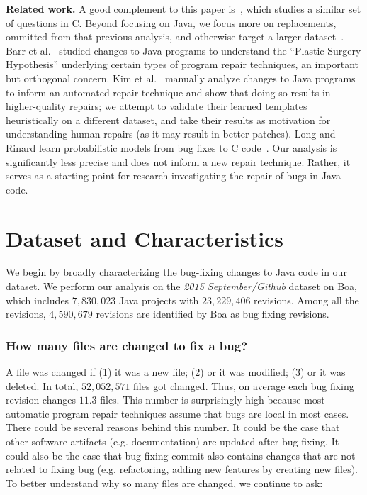 \documentclass{sig-alternate-05-2015}
\begin{document}
\noindent\textbf{Related work.} A good complement to this paper is~\cite{zhong2015}, which studies 
a similar set of questions in C.  Beyond focusing on Java, we focus more on
replacements, ommitted from that previous analysis, and otherwise target a
larger dataset~\cite{dyer2013}.  Barr et al.~\cite{Barr14fse} studied changes to
Java programs to understand the ``Plastic Surgery Hypothesis'' underlying
certain types of program repair techniques, an important but orthogonal
concern. Kim et al.~\cite{kim2013} manually analyze 
changes to Java programs to inform an automated repair
technique and show that doing so results in higher-quality repairs; 
we attempt to validate their learned templates heuristically on
a different dataset, and take their results as
motivation for understanding human repairs (as it may result in better patches).
Long and Rinard learn probabilistic models from bug fixes to C
code~\cite{Long2016}. Our analysis is significantly less precise and does not
inform a new repair technique.  Rather, it serves as a starting
point for research investigating the repair of bugs in Java code.

\section{Dataset and Characteristics}

We begin by broadly characterizing the bug-fixing changes to Java code in our
dataset.  We perform our analysis on the \emph{2015 September/Github} dataset on
Boa, which includes $7,830,023$ Java projects with $23,229,406$ revisions. Among
all the revisions, $4,590,679$ revisions are identified by Boa as bug fixing
revisions.

\subsubsection*{How many files are changed to fix a bug?} \vspace{-0.3em} 

A file was changed if (1) it was a new file; (2) or it was modified; (3) or it
was deleted. In total, $52,052,571$ files got changed. Thus, on average each bug
fixing revision changes $11.3$ files.  This number is surprisingly high because
most automatic program repair techniques assume that bugs are local in most
cases. There could be several reasons behind this number. It could be the case
that other software artifacts (e.g.  documentation) are updated after bug
fixing. It could also be the case that bug fixing commit also contains changes
that are not related to fixing bug (e.g. refactoring, adding new features by
creating new files). To better understand why so many files are changed, we
continue to ask:
\end{document}
